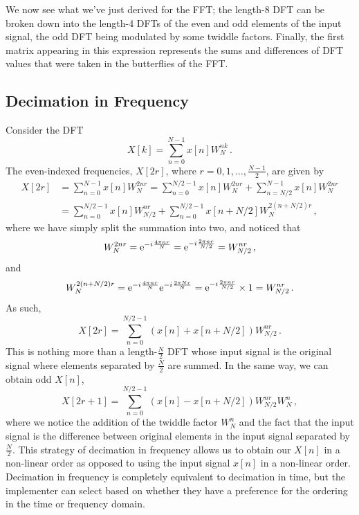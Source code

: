 %
We now see what we've just derived for the FFT; the length-8 DFT can be
broken down into the length-4 DFTs of the even and odd elements of the
input signal, the odd DFT being modulated by some twiddle factors. Finally,
the first matrix appearing in this expression represents the sums and
differences of DFT values that were taken in the butterflies of the FFT.

\subsection{Decimation in Frequency}
%
Consider the DFT
%
\begin{displaymath}
  X[k] = \sum_{n=0}^{N-1}x[n]W_N^{nk} \,.
\end{displaymath}
%
The even-indexed frequencies, $X[2r]$, where $r=0,1,\hdots,\frac{N-1}{2}$,
are given by
%
\begin{align*}
  X[2r] &= \sum_{n=0}^{N-1}x[n]W_N^{2nr}
  = \sum_{n=0}^{N/2-1}x[n] W_N^{2nr} + \sum_{n=N/2}^{N-1}x[n]W_N^{2nr} \\
  &= \sum_{n=0}^{N/2-1}x[n] W_{N/2}^{nr} + \sum_{n=0}^{N/2-1}x[n+N/2]W_N^{2(n+N/2)r} \,,  
\end{align*}
%
where we have simply split the summation into two, and noticed that
%
\begin{displaymath}
  W_N^{2nr} =\mathrm{e}^{-{i\mkern1mu}\frac{4\pi n r}{N}} = \mathrm{e}^{-{i\mkern1mu}\frac{2\pi n r}{N/2}} = W_{N/2}^{nr} \,,
\end{displaymath}
%
and
%
\begin{displaymath}
  W_N^{2(n+N/2)r} = \mathrm{e}^{-{i\mkern1mu}\frac{4\pi n r}{N}}\mathrm{e}^{-{i\mkern1mu}\frac{2\pi N r}{N}}
  = \mathrm{e}^{-{i\mkern1mu}\frac{2\pi n r}{N/2}}\times 1 = W_{N/2}^{nr} \,.
\end{displaymath}
%
As such,
%
\begin{displaymath}
  X[2r] = \sum_{n=0}^{N/2-1}\left(x[n] + x[n+N/2]\right) W_{N/2}^{nr} \,.
\end{displaymath}
%
This is nothing more than a length-$\frac{N}{2}$ DFT whose input signal is
the original signal where elements separated by $\frac{N}{2}$ are summed. In
the same way, we can obtain odd $X[n]$,
%
\begin{displaymath}
  X[2r+1] = \sum_{n=0}^{N/2-1}\left(x[n] - x[n+N/2]\right) W_{N/2}^{nr} W_N^n \,,
\end{displaymath}
%
where we notice the addition of the twiddle factor $W_N^n$ and the fact that
the input signal is the difference between original elements in the input signal
separated by $\frac{N}{2}$. This strategy of decimation in frequency allows us to
obtain our $X[n]$ in a non-linear order as opposed to using the input signal $x[n]$
in a non-linear order. Decimation in frequency is completely equivalent to decimation
in time, but the implementer can select based on whether they have a preference for
the ordering in the time or frequency domain.
